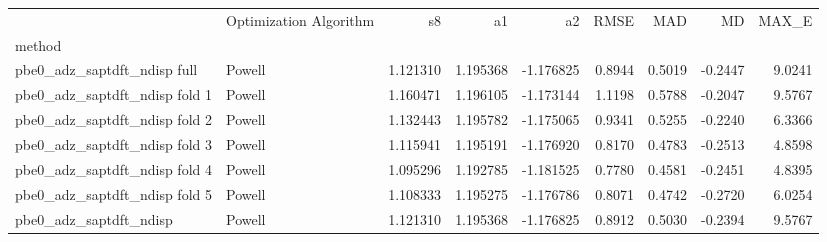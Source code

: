 \begin{tabular}{llrrrrrrr}
 & Optimization Algorithm & s8 & a1 & a2 & RMSE & MAD & MD & MAX_E \\
method &  &  &  &  &  &  &  &  \\
pbe0_adz_saptdft_ndisp full & Powell & 1.121310 & 1.195368 & -1.176825 & 0.8944 & 0.5019 & -0.2447 & 9.0241 \\
pbe0_adz_saptdft_ndisp fold 1 & Powell & 1.160471 & 1.196105 & -1.173144 & 1.1198 & 0.5788 & -0.2047 & 9.5767 \\
pbe0_adz_saptdft_ndisp fold 2 & Powell & 1.132443 & 1.195782 & -1.175065 & 0.9341 & 0.5255 & -0.2240 & 6.3366 \\
pbe0_adz_saptdft_ndisp fold 3 & Powell & 1.115941 & 1.195191 & -1.176920 & 0.8170 & 0.4783 & -0.2513 & 4.8598 \\
pbe0_adz_saptdft_ndisp fold 4 & Powell & 1.095296 & 1.192785 & -1.181525 & 0.7780 & 0.4581 & -0.2451 & 4.8395 \\
pbe0_adz_saptdft_ndisp fold 5 & Powell & 1.108333 & 1.195275 & -1.176786 & 0.8071 & 0.4742 & -0.2720 & 6.0254 \\
pbe0_adz_saptdft_ndisp & Powell & 1.121310 & 1.195368 & -1.176825 & 0.8912 & 0.5030 & -0.2394 & 9.5767 \\
\end{tabular}
